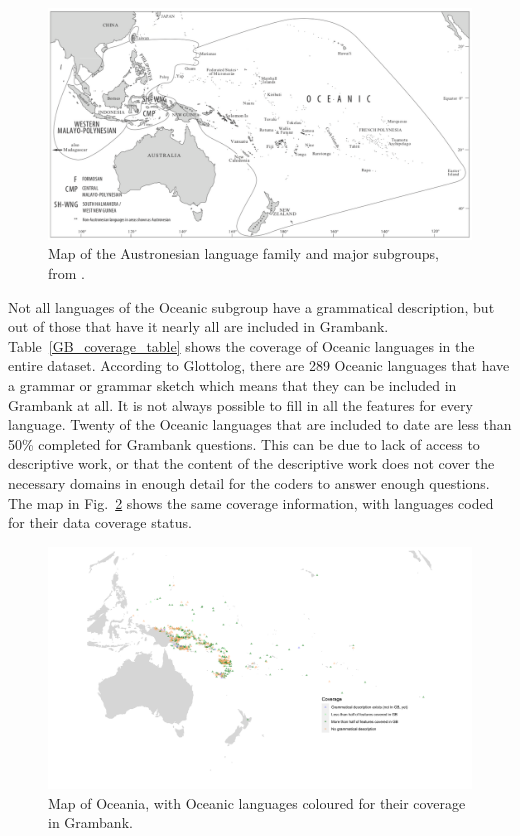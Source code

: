 \documentclass[a4paper,10pt]{article} %
\begin{document}
\begin{figure}[h]
\centering
\includegraphics[width=\textwidth]{illustrations/ross_pawley_osmond_protooceanic_vol5.png}
\caption{{Map of the Austronesian language family and major subgroups, from \citet[2]{protooceanicvol5}.}}
\label{Oceanic_map}
\end{figure} 

Not all languages of the Oceanic subgroup have a grammatical description, but out of those that have it nearly all are included in Grambank. Table~\ref{GB_coverage_table} shows the coverage of Oceanic languages in the entire dataset. According to Glottolog, there are 289 Oceanic languages that have a grammar or grammar sketch which means that they can be included in Grambank at all. It is not always possible to fill in all the features for every language. Twenty of the Oceanic languages that are included to date are less than 50\% completed for Grambank questions. This can be due to lack of access to descriptive work, or that the content of the descriptive work does not cover the necessary domains in enough detail for the coders to answer enough questions. The map in Fig.~\ref{GB_austro_coverage} shows the same coverage information, with languages coded for their data coverage status.

\newpage

\newpage

\begin{figure}
\centering
\includegraphics[width=\textwidth]{illustrations/plots_from_R/coverage_plots/maps/coverage_map_oceanic.png}
\caption{{Map of Oceania, with Oceanic languages coloured for their coverage in Grambank.}}
\label{GB_austro_coverage}
\end{figure} %
\end{document}
